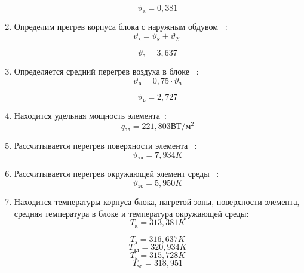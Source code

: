 \begin{enumerate}[label={\arabic*.}]
$$\vartheta\mathrm{_к} = 0,381$$

\item Определим прегрев корпуса блока с наружным обдувом
  ~\cite{Rotkop1976}:
  \begin{equation}
    \vartheta\mathrm{_з} =  \vartheta\mathrm{_к} + \vartheta_{21}
    \end{equation}
  
$$\vartheta\mathrm{_з} = 3,637$$

\item Определяется средний перегрев воздуха в блоке ~\cite{Rotkop1976}:
  \begin{equation}
    \vartheta\mathrm{_в} = 0,75 \cdot \vartheta\mathrm{_з}
  \end{equation}

  $$\vartheta\mathrm{_в} = 2,727$$
  \item Находится удельная мощность элемента~\cite{Rotkop1976}:
  $$q\mathrm{_{эл}} =221,803\mathrm{ВТ/м^2} $$
\item Рассчитывается перегрев поверхности элемента ~\cite{Rotkop1976}:
  $$\vartheta\mathrm{_{эл}} =7,934K$$

\item Рассчитывается перегрев окружающей элемент среды ~\cite{Rotkop1976}:
  $$\vartheta\mathrm{_{эс}} = 5,950K$$

  
  
\item Находится температуры корпуса блока, нагретой зоны, поверхности
  элемента, средняя температура в блоке и температура окружающей среды:
  $$T\mathrm{_{к}} = 313,381 K$$
  
    $$T\mathrm{_з} = 316,637 K$$
    $$T\mathrm{_{эл}} = 320,934 K$$
    $$T\mathrm{_{в}} = 315,728 K$$
    $$T\mathrm{_{эс}} =318,951$$

\end{enumerate}
